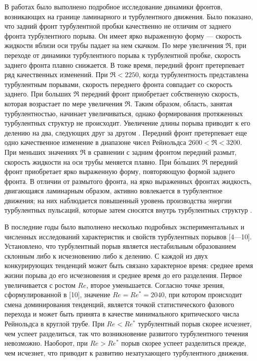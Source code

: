 В работах \cite{Moxey2010, Barkley2015, Song2017} было выполнено подробное исследование динамики фронтов, возникающих на границе ламинарного и турбулентного движения. Было показано, что задний фронт турбулентной пробки качественно не отличим от заднего фронта турбулентного порыва. Он имеет ярко выраженную форму --- скорость жидкости вблизи оси трубы падает на нем скачком. По мере увеличения $\Re$, при переходе от динамики турбулентного порыва к турбулентной пробке, скорость заднего фронта плавно снижается. В тоже время, передний фронт претерпевает ряд качественных изменений. При $\Re < 2250$, когда турбулентность представлена турбулентным порывами, скорость переднего фронта совпадает со скорость заднего. При больших $\Re$ передний фронт приобретает собственную скорость, которая возрастает по мере увеличения $\Re$. Таким образом, область, занятая турбулентностью, начинает увеличиваться, однако формирования протяженных турбулентных структур не происходит. Увеличение длины порыва приводит к его делению на два, следующих друг за другом \cite{Moxey2010}. Передний фронт претерпевает еще одно качественное изменение в диапазоне чисел Рейнольдса $2600 < \Re < 3200$. При меньших значениях $\Re$ в сравнении с задним фронтом передний размыт, скорость жидкости на оси трубы меняется плавно. При б\'{о}льших $\Re$ передний фронт приобретает ярко выраженную форму, повторяющую формой заднего фронта. В отличии от размытого фронта, на ярко выраженных фронтах жидкость, двигающаяся ламинарным образом, активно вовлекается в турбулентное движения; на них наблюдается повышенный уровень производства энергии турбулентных пульсаций, которые затем сносятся внутрь турбулентных структур \cite{Song2017}. 



В последние годы было выполнено несколько подробных экспериментальных и численных исследований характеристик и свойств турбулентных порывов [4---10]. Установлено, что турбулентный порыв является нестабильным образованием склонным либо к исчезновению либо к делению. С каждой из двух конкурирующих тенденций может быть связано характерное время: среднее время жизни порыва до его исчезновения и среднее время до его разделения. Первое увеличивается с ростом $Re$, второе уменьшается. Согласно точке зрения, сформулированной в [10], значение $Re=Re^*=2040$, при котором происходит смена доминирования тенденций, является точкой статистического фазового перехода и может быть принята в качестве минимального критического числа Рейнольдса в круглой трубе. При $Re<Re^*$ турбулентный порыв скорее исчезнет, чем успеет разделиться, так что возникновение развитого турбулентного течения невозможно. Наоборот, при $Re>Re^*$ порыв скорее успеет разделиться прежде, чем исчезнет, что приводит к развитию незатухающего турбулентного движения.


